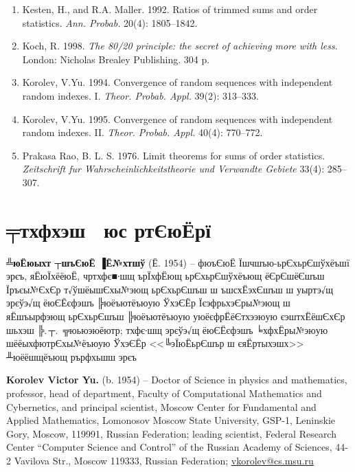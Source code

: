 \documentclass[14pt,a4paper]{extarticle}
\begin{document}
\begin{enumerate}
\item
Kesten, H., and R.A. Maller. 1992.
Ratios of trimmed sums and order statistics.
{\it Ann. Probab.} 20(4): 1805--1842.

\item
Koch, R. 1998.
{\it The 80/20 principle: the secret of achieving more with less}. 
London: Nicholas Brealey Publishing. 304 p. 

\item
Korolev, V.Yu. 1994.
Convergence of random sequences with independent random indexes. I.
{\it Theor. Probab. Appl.} 39(2): 313--333.

\item
Korolev, V.Yu. 1995.
Convergence of random sequences with independent random indexes. II.
{\it Theor. Probab. Appl.} 40(4): 770--772.

\item
Prakasa Rao, B. L. S. 1976.
Limit theorems for sums of order statistics.
{\it Zeitschrift fur Wahrscheinlichkeitstheorie und Verwandte Gebiete}
33(4): 285--307.


\end{enumerate}




\section*{╤тхфхэш  юс ртЄюЁрї}

\small

{\bfseries ╩юЁюыхт ┬шъЄюЁ ▐Ё№хтшў} (Ё. 1954) -- фюъЄюЁ Їшчшъю-ьрЄхьрЄшўхёъшї эрєъ, яЁюЇхёёюЁ, чртхфє■∙шщ ърЇхфЁющ ьрЄхьрЄшўхёъющ ёЄрЄшёЄшъш Їръєы№ЄхЄр т√ўшёышЄхы№эющ ьрЄхьрЄшъш ш ъшсхЁэхЄшъш ш уыртэ√щ эрєўэ√щ ёюЄЁєфэшъ ╠юёъютёъюую ЎхэЄЁр ЇєэфрьхэЄры№эющ ш яЁшъырфэющ ьрЄхьрЄшъш ╠юёъютёъюую уюёєфрЁёЄтхээюую єэштхЁёшЄхЄр шьхэш ╠.\,┬.~╦юьюэюёютр; тхфє∙шщ эрєўэ√щ ёюЄЁєфэшъ ╘хфхЁры№эюую шёёыхфютрЄхы№ёъюую ЎхэЄЁр <<╚эЇюЁьрЄшър ш єяЁртыхэшх>> ╨юёёшщёъющ рърфхьшш эрєъ


{\bfseries Korolev Victor Yu.} (b. 1954) -- Doctor of Science in physics and
mathematics, professor, head of department, Faculty of Computational Mathematics and Cybernetics, and principal scientist, Moscow Center for Fundamental and Applied Mathematics, Lomonosov Moscow State University, GSP-1, Leninskie Gory, Moscow, 119991, Russian Federation; leading scientist, Federal Research Center ``Computer Science and Control'' of the Russian Academy of Sciences, 44-2 Vavilova Str., Moscow 119333, Russian Federation; \url{vkorolev@cs.msu.ru}
\end{document}
